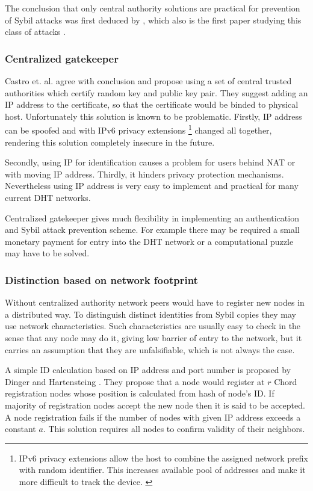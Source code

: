   The conclusion that only central authority solutions are practical for
  prevention of Sybil attacks was first deduced by \cite{dou02}, which also is
  the first paper studying this class of attacks \cite{urd11}.

  \subsubsection{Centralized gatekeeper}
  Castro et. al. \cite{cas02} agree with \cite{dou02} conclusion and propose
  using a set of central trusted authorities which certify random key and public
  key pair. They suggest adding an IP address to the certificate, so that the
  certificate would be binded to physical host. Unfortunately this solution is
  known to be problematic. Firstly, IP address can be spoofed and with IPv6
  privacy extensions 
  \footnote{IPv6 privacy extensions allow the host to combine the assigned
    network prefix with random identifier. This increases available pool of
    addresses and make it more difficult to track the device.
  \cite{nar01}}
  changed all together, rendering this solution completely
  insecure in the future.
  
  Secondly, using IP for identification causes a problem
  for users behind NAT or with moving IP address. Thirdly, it hinders privacy
  protection mechanisms. Nevertheless using IP address is very easy to implement
  and practical for many current DHT networks.

  Centralized gatekeeper gives much flexibility in implementing an
  authentication and Sybil attack prevention scheme. For example there may be
  required a small monetary payment for entry into the DHT network or a
  computational puzzle may have to be solved.

  \subsubsection{Distinction based on network footprint}

  Without centralized authority network peers would have to register new nodes
  in a distributed way. To distinguish distinct identities from Sybil copies
  they may use network characteristics. Such characteristics are usually easy to
  check in the sense that any node may do it, giving low barrier of entry to the
  network, but it carries an assumption that they are unfalsifiable, which is
  not always the case.

  A simple ID calculation based on IP address and port number is proposed by
  Dinger and Hartensteing \cite{din06}. They propose that a node would
  register at $r$ Chord registration nodes whose position is calculated from
  hash of node's ID. If majority of registration nodes accept the new node then
  it is said to be accepted. A node registration fails if the number of nodes
  with given IP address exceeds a constant $a$. This solution requires all nodes
  to confirm validity of their neighbors.

